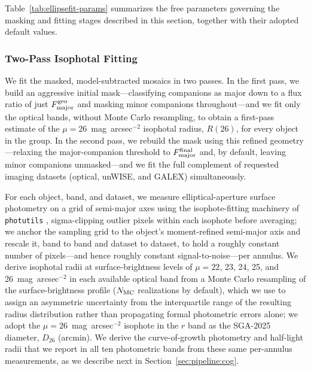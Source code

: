 \documentclass[modern,linenumbers]{aastex701}
\begin{document}
Table~\ref{tab:ellipsefit-params} summarizes the free parameters
governing the masking and fitting stages described in this section,
together with their adopted default values.



\subsubsection{Two-Pass Isophotal Fitting}
\label{sec:pipeline:ellipse:fit}

We fit the masked, model-subtracted mosaics in two passes. In the first
pass, we build an aggressive initial mask---classifying companions as
major down to a flux ratio of just $F_{\rm major}^{\rm geo}$ and masking
minor companions throughout---and we fit only the optical bands,
without Monte Carlo resampling, to obtain a first-pass estimate of the
$\mu = 26$~mag~arcsec$^{-2}$ isophotal radius, $R(26)$, for every object
in the group. In the second pass, we rebuild the mask using this
refined geometry---relaxing the major-companion threshold to
$F_{\rm major}^{\rm final}$ and, by default, leaving minor companions
unmasked---and we fit the full complement of requested imaging datasets
(optical, unWISE, and GALEX) simultaneously.

For each object, band, and dataset, we measure elliptical-aperture
surface photometry on a grid of semi-major axes using the
isophote-fitting machinery of \texttt{photutils} \citep{bradley23a},
sigma-clipping outlier pixels within each isophote before averaging; we
anchor the sampling grid to the object's moment-refined semi-major axis
and rescale it, band to band and dataset to dataset, to hold a roughly
constant number of pixels---and hence roughly constant signal-to-noise---per
annulus. We derive isophotal radii at surface-brightness levels
of $\mu = 22$, 23, 24, 25, and 26~mag~arcsec$^{-2}$ in each available
optical band from a Monte Carlo resampling of the surface-brightness
profile ($N_{\rm MC}$ realizations by default), which we use to assign
an asymmetric uncertainty from the interquartile range of the resulting
radius distribution rather than propagating formal photometric errors
alone; we adopt the $\mu = 26$~mag~arcsec$^{-2}$ isophote in the $r$
band as the SGA-2025 diameter, $D_{26}$ (arcmin). We derive the
curve-of-growth photometry and half-light radii that we report in all
ten photometric bands from these same per-annulus measurements, as we
describe next in Section~\ref{sec:pipeline:cog}.
\end{document}
